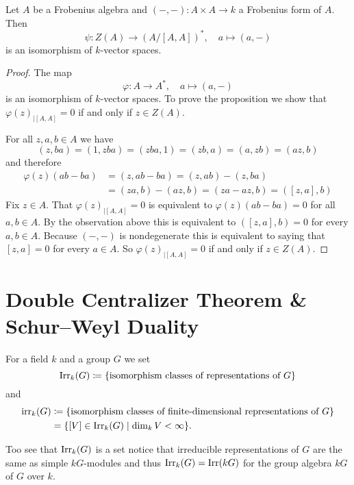 \begin{prop}
  Let $A$ be a Frobenius algebra and $(-,-) \colon A \times A \to k$ a Frobenius form of $A$. Then
  \[
            \psi
    \colon  Z(A)
    \to     (A/[A,A])^*,
    \quad   a
    \mapsto (a,-)
  \]
  is an isomorphism of $k$-vector spaces.
\end{prop}
\begin{proof}
  The map
  \[
            \varphi
    \colon  A
    \to     A^*,
    \quad   a
    \mapsto (a, -)
  \]
  is an isomorphism of $k$-vector spaces.
  To prove the proposition we show that $\varphi(z)_{|[A,A]} = 0$ if and only if $z \in Z(A)$.
  
  For all $z, a, b \in A$ we have
  \[
      (z,ba)
    = (1,zba)
    = (zba,1)
    = (zb,a)
    = (a,zb)
    = (az,b)
  \]
  and therefore
  \begin{align*}
        \varphi(z)(ab-ba)
    &=  (z,ab-ba)
     =  (z,ab) - (z,ba) \\
    &=  (za,b) - (az,b)
     =  (za-az,b)
     =  ([z,a],b)
  \end{align*}
  Fix $z \in A$.
  That $\varphi(z)_{|[A,A]} = 0$ is equivalent to $\varphi(z)(ab-ba) = 0$ for all $a,b \in A$.
  By the observation above this is equivalent to $([z,a],b) = 0$ for every $a,b \in A$.
  Because $(-,-)$ is nondegenerate this is equivalent to saying that $[z,a] = 0$ for every $a \in A$.
  So $\varphi(z)_{|[A,A]} = 0$ if and only if $z \in Z(A)$.
\end{proof}





\section{Double Centralizer Theorem \& Schur--Weyl Duality}


\begin{defi}
  For a field $k$ and a group $G$ we set
  \[
              \operatorname{Irr}_k(G)
    \coloneqq \{ \text{isomorphism classes of representations of $G$} \}
  \]
  and
  \begin{align*}
                \operatorname{irr}_k(G)
    &\coloneqq  \{ \text{isomorphism classes of finite-dimensional representations of $G$} \} \\
    &=          \{ [V] \in \operatorname{Irr}_k(G) \mid \dim_k V < \infty \}.
  \end{align*}
\end{defi}


Too see that $\operatorname{Irr}_k(G)$ is a set notice that irreducible representations of $G$ are the same as simple $kG$-modules and thus $\operatorname{Irr}_k(G) = \operatorname{Irr}(kG)$ for the group algebra $kG$ of $G$ over $k$.


